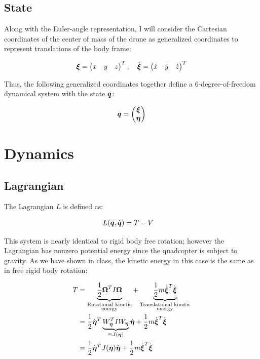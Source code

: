 \documentclass{article}
\begin{document}
\subsection{State}

Along with the Euler-angle representation, I will consider the Cartesian coordinates of the center of mass of the drone as generalized coordinates to represent translations of the body frame:

\begin{align}
    \boldsymbol{\xi} =  \begin{pmatrix} x & y & z \end{pmatrix}^T
    , \quad
    \dot{\boldsymbol{\xi}} =  \begin{pmatrix} \dot{x} & \dot{y} & \dot{z} \end{pmatrix}^T
\end{align}

Thus, the following generalized coordinates together define a 6-degree-of-freedom dynamical system with the state $\boldsymbol{q}$:

\begin{align}
    \boldsymbol{q} = \begin{pmatrix} \boldsymbol{\xi} \\ \boldsymbol{\eta} \end{pmatrix}
\end{align}

\newpage
\section{Dynamics}

\subsection{Lagrangian}

The Lagrangian $L$ is defined as:

\begin{align}
    L (\boldsymbol{q}, \dot{\boldsymbol{q}}) & = T - V 
\end{align}

This system is nearly identical to rigid body free rotation; however the Lagrangian has nonzero potential energy since the quadcopter is subject to gravity. As we have shown in class, the kinetic energy in this case is the same as in free rigid body rotation:

\begin{align}
    T & = 
    \underbrace{\frac{1}{2} \boldsymbol{\Omega}^T I \boldsymbol{\Omega}}
    _{\substack{\text{Rotational kinetic} \\ \text{energy}}} + 
    \underbrace{\frac{1}{2} m \dot{\boldsymbol{\xi}}^T \dot{\boldsymbol{\xi}}}
    _{\substack{\text{Translational kinetic} \\ \text{energy}}} \\ 
    & = 
    \frac{1}{2} \dot{\boldsymbol{\eta}}^T \underbrace{W_{\boldsymbol{\eta}}^T I W_{\boldsymbol{\eta}}}
    _{\equiv J (\boldsymbol{\eta})} \dot{\boldsymbol{\eta}} +
    \frac{1}{2} m \dot{\boldsymbol{\xi}}^T \dot{\boldsymbol{\xi}} \\
    & =
    \frac{1}{2} \dot{\boldsymbol{\eta}}^T J(\boldsymbol{\eta}) \dot{\boldsymbol{\eta}} +
    \frac{1}{2} m \dot{\boldsymbol{\xi}}^T \dot{\boldsymbol{\xi}}
\end{align}
\end{document}
